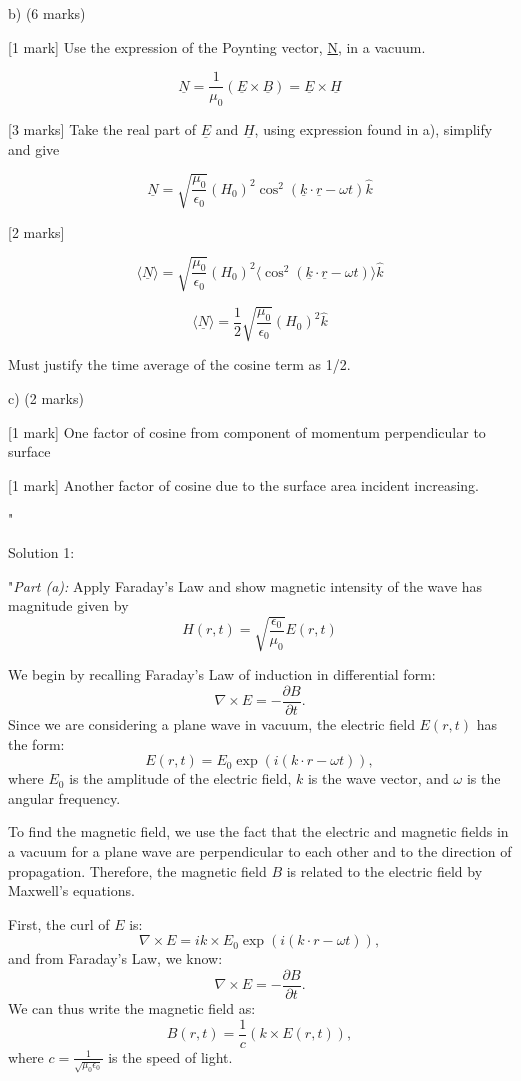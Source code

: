 b) (6 marks)

[1 mark] Use the expression of the Poynting vector, \underline{N}, in a vacuum. 

\[ \underline{N} = \frac{1}{\mu_0} ( \underline{E} \times \underline{B} ) = \underline{E} \times \underline{H} \]

[3 marks] Take the real part of \( \underline{E} \) and \( \underline{H} \), using expression found in a), simplify and give 

\[ \underline{N} = \sqrt{\frac{\mu_0}{\epsilon_0}} (H_0)^2 \cos^2(\underline{k} \cdot \underline{r} - \omega t) \hat{k} \]

[2 marks] 

\[ \langle \underline{N} \rangle = \sqrt{\frac{\mu_0}{\epsilon_0}} (H_0)^2 \langle \cos^2(\underline{k} \cdot \underline{r} - \omega t) \rangle \hat{k} \]

\[ \langle \underline{N} \rangle = \frac{1}{2}\sqrt{\frac{\mu_0}{\epsilon_0}} (H_0)^2 \hat{k} \]

Must justify the time average of the cosine term as 1/2.

c) (2 marks) 

[1 mark] One factor of cosine from component of momentum perpendicular to surface

[1 mark] Another factor of cosine due to the surface area incident increasing. 



"

Solution 1:

"\textit{Part (a):} Apply Faraday’s Law and show magnetic intensity of the wave has magnitude given by
\[
H(r, t) = \sqrt{\frac{\epsilon_0}{\mu_0}} E(r, t)
\]

We begin by recalling Faraday’s Law of induction in differential form:
\[
\nabla \times E = - \frac{\partial B}{\partial t}.
\]
Since we are considering a plane wave in vacuum, the electric field \(E(r,t)\) has the form:
\[
E(r, t) = E_0 \exp(i(k \cdot r - \omega t)),
\]
where \(E_0\) is the amplitude of the electric field, \(k\) is the wave vector, and \(\omega\) is the angular frequency.

To find the magnetic field, we use the fact that the electric and magnetic fields in a vacuum for a plane wave are perpendicular to each other and to the direction of propagation. Therefore, the magnetic field \(B\) is related to the electric field by Maxwell's equations.

First, the curl of \(E\) is:
\[
\nabla \times E = i k \times E_0 \exp(i(k \cdot r - \omega t)),
\]
and from Faraday’s Law, we know:
\[
\nabla \times E = - \frac{\partial B}{\partial t}.
\]
We can thus write the magnetic field as:
\[
B(r, t) = \frac{1}{c} (k \times E(r, t)),
\]
where \(c = \frac{1}{\sqrt{\mu_0 \epsilon_0}}\) is the speed of light.

